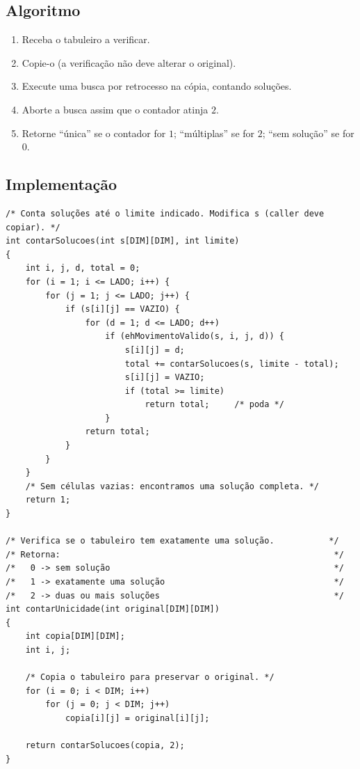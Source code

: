 \documentclass[11pt,a4paper,oneside]{report}
\begin{document}
\subsection{Algoritmo}

\begin{enumerate}
    \item Receba o tabuleiro a verificar.
    \item Copie-o (a verificação não deve alterar o original).
    \item Execute uma busca por retrocesso na cópia, contando soluções.
    \item Aborte a busca assim que o contador atinja $2$.
    \item Retorne ``única'' se o contador for $1$; ``múltiplas'' se for
        $2$; ``sem solução'' se for $0$.
\end{enumerate}

\subsection{Implementação}

\begin{lstlisting}[caption={Contagem limitada de soluções e teste de unicidade.},label={lst:unique}]
/* Conta soluções até o limite indicado. Modifica s (caller deve copiar). */
int contarSolucoes(int s[DIM][DIM], int limite)
{
    int i, j, d, total = 0;
    for (i = 1; i <= LADO; i++) {
        for (j = 1; j <= LADO; j++) {
            if (s[i][j] == VAZIO) {
                for (d = 1; d <= LADO; d++)
                    if (ehMovimentoValido(s, i, j, d)) {
                        s[i][j] = d;
                        total += contarSolucoes(s, limite - total);
                        s[i][j] = VAZIO;
                        if (total >= limite)
                            return total;     /* poda */
                    }
                return total;
            }
        }
    }
    /* Sem células vazias: encontramos uma solução completa. */
    return 1;
}

/* Verifica se o tabuleiro tem exatamente uma solução.           */
/* Retorna:                                                       */
/*   0 -> sem solução                                             */
/*   1 -> exatamente uma solução                                  */
/*   2 -> duas ou mais soluções                                   */
int contarUnicidade(int original[DIM][DIM])
{
    int copia[DIM][DIM];
    int i, j;

    /* Copia o tabuleiro para preservar o original. */
    for (i = 0; i < DIM; i++)
        for (j = 0; j < DIM; j++)
            copia[i][j] = original[i][j];

    return contarSolucoes(copia, 2);
}
\end{lstlisting}
\end{document}
